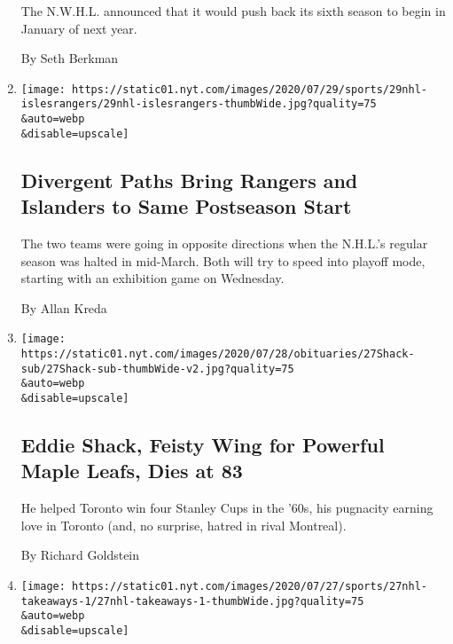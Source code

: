 \begin{enumerate}
  The N.W.H.L. announced that it would push back its sixth season to
  begin in January of next year.

  By Seth Berkman
\item
  \href{/2020/07/29/sports/hockey/new-york-rangers-islanders-playoffs.html}{}

  \texttt{[image: https://static01.nyt.com/images/2020/07/29/sports/29nhl-islesrangers/29nhl-islesrangers-thumbWide.jpg?quality=75\\\&auto=webp\\\&disable=upscale]}

  \hypertarget{divergent-paths-bring-rangers-and-islanders-to-same-postseason-start}{%
  \subsection{Divergent Paths Bring Rangers and Islanders to Same
  Postseason
  Start}\label{divergent-paths-bring-rangers-and-islanders-to-same-postseason-start}}

  The two teams were going in opposite directions when the N.H.L.'s
  regular season was halted in mid-March. Both will try to speed into
  playoff mode, starting with an exhibition game on Wednesday.

  By Allan Kreda
\item
  \href{/2020/07/27/sports/hockey/eddie-shack-feisty-wing-for-powerful-maple-leafs-dies-at-83.html}{}

  \texttt{[image: https://static01.nyt.com/images/2020/07/28/obituaries/27Shack-sub/27Shack-sub-thumbWide-v2.jpg?quality=75\\\&auto=webp\\\&disable=upscale]}

  \hypertarget{eddie-shack-feisty-wing-for-powerful-maple-leafs-dies-at-83}{%
  \subsection{Eddie Shack, Feisty Wing for Powerful Maple Leafs, Dies at
  83}\label{eddie-shack-feisty-wing-for-powerful-maple-leafs-dies-at-83}}

  He helped Toronto win four Stanley Cups in the '60s, his pugnacity
  earning love in Toronto (and, no surprise, hatred in rival Montreal).

  By Richard Goldstein
\item
  \href{/2020/07/27/sports/hockey/nhl-awards-restart-postseason.html}{}

  \texttt{[image: https://static01.nyt.com/images/2020/07/27/sports/27nhl-takeaways-1/27nhl-takeaways-1-thumbWide.jpg?quality=75\\\&auto=webp\\\&disable=upscale]}


\end{enumerate}
